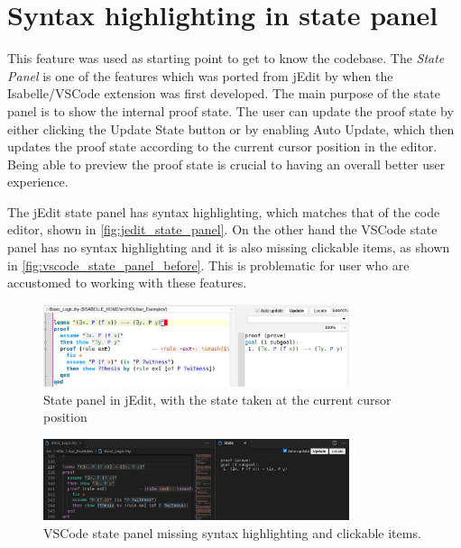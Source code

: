 \section{Syntax highlighting in state panel}
\label{section:state-panel}
This feature was used as starting point to get to know the codebase. The \emph{State Panel} is one of the features which was ported from jEdit by \citeauthor{ivsc_report} when the Isabelle/VSCode extension was first developed. The main purpose of the state panel is to show the internal proof state. The user can update the proof state by either clicking the Update State button or by enabling Auto Update, which then updates the proof state according to the current cursor position in the editor. Being able to preview the proof state is crucial to having an overall better user experience.

The jEdit state panel has syntax highlighting, which matches that of the code editor, shown in \autoref{fig:jedit_state_panel}. On the other hand the VSCode state panel has no syntax highlighting and it is also missing clickable items, as shown in \autoref{fig:vscode_state_panel_before}. This is problematic for user who are accustomed to working with these features.

\begin{figure}[htpb]
  \centering
  \includegraphics[width=0.8\textwidth]{figures/problem1/jedit_state_panel.png}
  \caption{State panel in jEdit, with the state taken at the current cursor position} \label{fig:jedit_state_panel}
\end{figure}

\begin{figure}[htpb]
  \centering
  \includegraphics[width=0.8\textwidth]{figures/problem1/vscode_state_panel_before.png}
  \caption{VSCode state panel missing syntax highlighting and clickable items.} 
  \label{fig:vscode_state_panel_before}
\end{figure}

